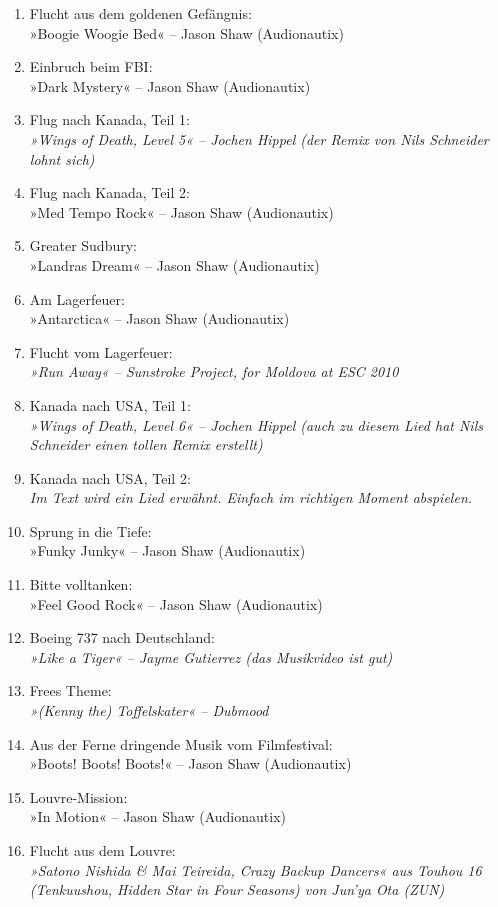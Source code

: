 \begin{enumerate}
    \item Flucht aus dem goldenen Gefängnis:\\ »Boogie Woogie Bed« – Jason Shaw (Audionautix)
    \item Einbruch beim FBI:\\ »Dark Mystery« – Jason Shaw (Audionautix)
    \item Flug nach Kanada, Teil 1:\\ \textit{»Wings of Death, Level 5« – Jochen Hippel (der Remix von Nils Schneider lohnt sich)}
    \item Flug nach Kanada, Teil 2:\\ »Med Tempo Rock« – Jason Shaw (Audionautix)
    \item Greater Sudbury:\\ »Landras Dream« – Jason Shaw (Audionautix)
    \item Am Lagerfeuer:\\ »Antarctica« – Jason Shaw (Audionautix)
    \item Flucht vom Lagerfeuer:\\ \textit{»Run Away« – Sunstroke Project, for Moldova at ESC 2010}
    \item Kanada nach USA, Teil 1:\\ \textit{»Wings of Death, Level 6« – Jochen Hippel (auch zu diesem Lied hat Nils Schneider einen tollen Remix erstellt)}
    \item Kanada nach USA, Teil 2:\\ \textit{Im Text wird ein Lied erwähnt. Einfach im richtigen Moment abspielen.}
    \item Sprung in die Tiefe:\\ »Funky Junky« – Jason Shaw (Audionautix)
    \item Bitte volltanken:\\ »Feel Good Rock« – Jason Shaw (Audionautix)
    \item Boeing 737 nach Deutschland:\\ \textit{»Like a Tiger« – Jayme Gutierrez (das Musikvideo ist gut)}
    \item Frees Theme:\\ \textit{»(Kenny the) Toffelskater« – Dubmood}
    \item Aus der Ferne dringende Musik vom Filmfestival:\\ »Boots! Boots! Boots!« – Jason Shaw (Audionautix)
    \item Louvre-Mission:\\ »In Motion« – Jason Shaw (Audionautix)
    \item Flucht aus dem Louvre:\\ \textit{»Satono Nishida \& Mai Teireida, Crazy Backup Dancers« aus Touhou 16 (Tenkuushou, Hidden Star in Four Seasons) von Jun'ya Ota (ZUN)}

\end{enumerate}
